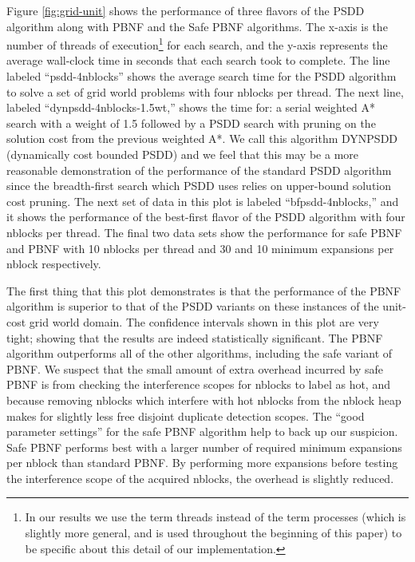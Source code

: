 \documentclass{article}
\begin{document}
Figure \ref{fig:grid-unit} shows the performance of three flavors of
the PSDD algorithm along with PBNF and the Safe PBNF algorithms.  The
x-axis is the number of threads of execution\footnote{In our results
  we use the term threads instead of the term processes (which is
  slightly more general, and is used throughout the beginning of this
  paper) to be specific about this detail of our implementation.} for
each search, and the y-axis represents the average wall-clock time in
seconds that each search took to complete. The line labeled
``psdd-4nblocks'' shows the average search time for the PSDD algorithm
to solve a set of grid world problems with four nblocks per thread.
The next line, labeled ``dynpsdd-4nblocks-1.5wt,'' shows the time for:
a serial weighted A* search with a weight of 1.5 followed by a PSDD
search with pruning on the solution cost from the previous weighted
A*.  We call this algorithm DYNPSDD (dynamically cost bounded PSDD)
and we feel that this may be a more reasonable demonstration of the
performance of the standard PSDD algorithm since the breadth-first
search which PSDD uses relies on upper-bound solution cost pruning.
The next set of data in this plot is labeled ``bfpsdd-4nblocks,'' and
it shows the performance of the best-first flavor of the PSDD
algorithm with four nblocks per thread.  The final two data sets show
the performance for safe PBNF and PBNF with 10 nblocks per thread and
30 and 10 minimum expansions per nblock respectively.

The first thing that this plot demonstrates is that the performance of
the PBNF algorithm is superior to that of the PSDD variants on these
instances of the unit-cost grid world domain.  The confidence
intervals shown in this plot are very tight; showing that the results
are indeed statistically significant.  The PBNF algorithm outperforms
all of the other algorithms, including the safe variant of PBNF.  We
suspect that the small amount of extra overhead incurred by safe PBNF
is from checking the interference scopes for nblocks to label as hot,
and because removing nblocks which interfere with hot nblocks from the
nblock heap makes for slightly less free disjoint duplicate detection
scopes.  The ``good parameter settings'' for the safe PBNF algorithm
help to back up our suspicion.  Safe PBNF performs best with a larger
number of required minimum expansions per nblock than standard PBNF.
By performing more expansions before testing the interference scope of
the acquired nblocks, the overhead is slightly reduced.
\end{document}
